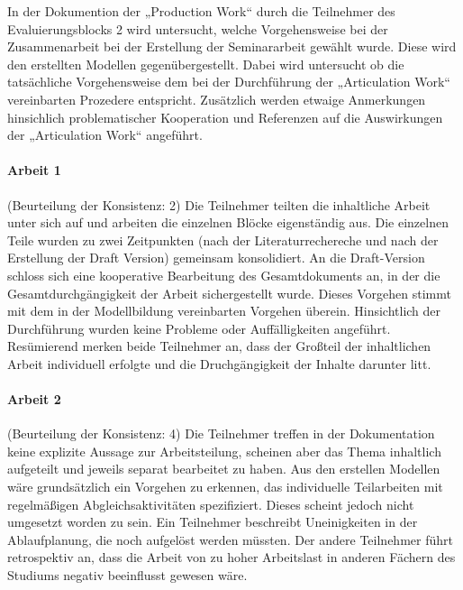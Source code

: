 In der Dokumention der „Production Work“ durch die Teilnehmer des Evaluierungsblocks 2 wird untersucht, welche Vorgehensweise bei der Zusammenarbeit bei der Erstellung der Seminararbeit gewählt wurde. Diese wird den erstellten Modellen gegenübergestellt. Dabei wird untersucht ob die tatsächliche Vorgehensweise dem bei der Durchführung der „Articulation Work“ vereinbarten Prozedere entspricht. Zusätzlich werden etwaige Anmerkungen hinsichlich problematischer Kooperation und Referenzen auf die Auswirkungen der „Articulation Work“ angeführt.

\paragraph{Arbeit 1} %
\label{par:arbeit_1}

(Beurteilung der Konsistenz: 2) Die Teilnehmer teilten die inhaltliche Arbeit unter sich auf und arbeiten die einzelnen Blöcke eigenständig aus. Die einzelnen Teile wurden zu zwei Zeitpunkten (nach der Literaturrechereche und nach der Erstellung der Draft Version) gemeinsam konsolidiert. An die Draft-Version schloss sich eine kooperative Bearbeitung des Gesamtdokuments an, in der die Gesamtdurchgängigkeit der Arbeit sichergestellt wurde. Dieses Vorgehen stimmt mit dem in der Modellbildung vereinbarten Vorgehen überein. Hinsichtlich der Durchführung wurden keine Probleme oder Auffälligkeiten angeführt. Resümierend merken beide Teilnehmer an, dass der Großteil der inhaltlichen Arbeit individuell erfolgte und die Druchgängigkeit der Inhalte darunter litt.


\paragraph{Arbeit 2} %
\label{par:arbeit_2}

(Beurteilung der Konsistenz: 4) Die Teilnehmer treffen in der Dokumentation keine explizite Aussage zur Arbeitsteilung, scheinen aber das Thema inhaltlich aufgeteilt und jeweils separat bearbeitet zu haben. Aus den erstellen Modellen wäre grundsätzlich ein Vorgehen zu erkennen, das individuelle Teilarbeiten mit regelmäßigen Abgleichsaktivitäten spezifiziert. Dieses scheint jedoch nicht umgesetzt worden zu sein. Ein Teilnehmer beschreibt Uneinigkeiten in der Ablaufplanung, die noch aufgelöst werden müssten. Der andere Teilnehmer führt retrospektiv an, dass die Arbeit von zu hoher Arbeitslast in anderen Fächern des Studiums negativ beeinflusst gewesen wäre.  

